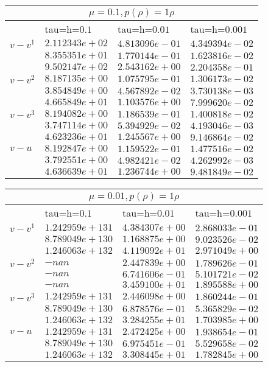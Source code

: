 \documentclass[11pt]{extarticle}
\begin{document}
		\begin{tabular}{ |l|l|l|l|}
		\hline
		\multicolumn{4}{|c|}{$\mu = 0.1 , p(\rho) = 1\rho$}\\
		\hline
		$ $ & tau=h=$0.1$& tau=h=$0.01$ & tau=h=$0.001$\\
		\hline
		$v - v^{1}$ & $2.112343e+02$ & $4.813096e-01$ & $4.349394e-02$ \\
					& $8.355351e+01$ & $1.770144e-01$ & $1.623816e-02$ \\
					& $9.502147e+02$ & $2.543162e+00$ & $2.204358e-01$ \\
		\hline
		$v - v^{2}$ & $8.187135e+00$ & $1.075795e-01$ & $1.306173e-02$ \\
					& $3.854849e+00$ & $4.567892e-02$ & $3.730138e-03$ \\
					& $4.665849e+01$ & $1.103576e+00$ & $7.999620e-02$ \\
		\hline
		$v - v^{3}$ & $8.194082e+00$ & $1.186539e-01$ & $1.400818e-02$ \\
					& $3.747114e+00$ & $5.394929e-02$ & $4.193046e-03$ \\
					& $4.623236e+01$ & $1.245567e+00$ & $9.146864e-02$ \\
		\hline
		$v - u$ 	& $8.192847e+00$ & $1.159522e-01$ & $1.477516e-02$ \\
					& $3.792551e+00$ & $4.982421e-02$ & $4.262992e-03$ \\
					& $4.636639e+01$ & $1.236744e+00$ & $9.481849e-02$ \\
		\hline
	\end{tabular}

		\begin{tabular}{ |l|l|l|l|}
		\hline
		\multicolumn{4}{|c|}{$\mu = 0.01 , p(\rho) = 1\rho$}\\
		\hline
		$ $ & tau=h=$0.1$& tau=h=$0.01$ & tau=h=$0.001$\\
		\hline
		$v - v^{1}$ & $1.242959e+131$ & $4.384307e+00$ & $2.868033e-01$ \\
					& $8.789049e+130$ & $1.168875e+00$ & $9.023526e-02$ \\
					& $1.246063e+132$ & $4.119092e+01$ & $2.971049e+00$ \\
		\hline
		$v - v^{2}$ & $-nan$ 		  & $2.447839e+00$ & $1.789626e-01$ \\
					& $-nan$ 		  & $6.741606e-01$ & $5.101721e-02$ \\
					& $-nan$ 		  & $3.459100e+01$ & $1.895588e+00$ \\
		\hline
		$v - v^{3}$ & $1.242959e+131$ & $2.446098e+00$ & $1.860244e-01$ \\
					& $8.789049e+130$ & $6.878576e-01$ & $5.365829e-02$ \\
					& $1.246063e+132$ & $3.284255e+01$ & $1.703985e+00$ \\
		\hline
		$v - u$ 	& $1.242959e+131$ & $2.472425e+00$ & $1.938654e-01$ \\
					& $8.789049e+130$ & $6.975451e-01$ & $5.529658e-02$ \\
					& $1.246063e+132$ & $3.308445e+01$ & $1.782845e+00$ \\
		\hline
	\end{tabular}
	
	

	
\end{document}
